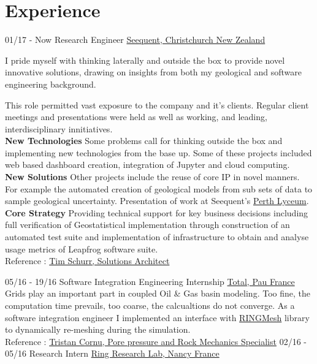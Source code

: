 \documentclass[]{friggeri-cv}
\begin{document}
\section{Experience}
\begin{entrylist}
  \entry
    {01/17 - Now}
    {Research Engineer}
    {\href{https://www.seequent.com/}{Seequent, Christchurch New Zealand}}
    {I pride myself with thinking laterally and outside the box to provide novel innovative solutions, drawing on insights from both my geological and software engineering background.
    
    This role permitted vast exposure to the company and it's clients. Regular client meetings and presentations were held as well as working, and leading, interdisciplinary innitiatives.
    \\[6pt]
   	\textbf{New Technologies} Some problems call for thinking outside the box and implementing new technologies from the base up. Some of these projects included web based dashboard creation, integration of Jupyter and cloud computing.
   	\\[6pt]
   	\textbf{New Solutions} Other projects include the reuse of core IP in novel manners. For example the automated creation of geological models from sub sets of data to sample geological uncertainty. Presentation of work at Seequent's \href{https://lyceum-perth.seequent.com/}{Perth Lyceum}.
    \\[6pt]
   	\textbf{Core Strategy} Providing technical support for key business decisions including full verification of Geostatistical implementation through construction of an automated test suite and implementation of infrastructure to obtain and analyse usage metrics of Leapfrog software suite. 
    \\
    Reference : \href{mailto:tim.schurr@seequent.com}{Tim Schurr, Solutions Architect}
	}
  \entry
    {05/16 - 19/16}
    {Software Integration Engineering Internship}
    {\href{https://www.total.com/en}{Total, Pau France}}
    {Grids play an important part in coupled Oil \& Gas basin modeling. Too fine, the computation time prevails, too coarse, the calcualtions do not converge. As a software integration engineer I implemented an interface with \href{http://www.ring-team.org/software/ringmesh}{RINGMesh} library to dynamically re-meshing during the simulation.\\ Reference : \href{mailto:tristan.cornu@total.com}{Tristan Cornu, Pore pressure and Rock Mechanics Specialist}}
    \entry
    {02/16 - 05/16}
    {Research Intern}
    {\href{http://www.ring-team.org/}{Ring Research Lab, Nancy France }}

\end{entrylist}
\end{document}
